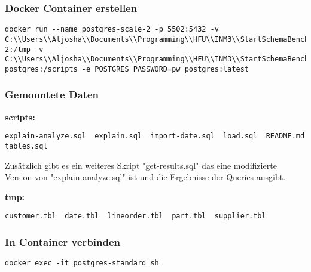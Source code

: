 \label{sec:appendix-ssb-in-postgres}

\subsubsection{Docker Container erstellen}
\begin{lstlisting}[caption=Ohne Config, label=code:ohneconfig]
docker run --name postgres-scale-2 -p 5502:5432 -v C:\\Users\\Aljosha\\Documents\\Programming\\HFU\\INM3\\StartSchemaBenchmark\\generated\\scale-2:/tmp -v C:\\Users\\Aljosha\\Documents\\Programming\\HFU\\INM3\\StartSchemaBenchmark\\Postgres\\ssb-postgres:/scripts -e POSTGRES_PASSWORD=pw postgres:latest
\end{lstlisting}

\subsubsection{Gemountete Daten}
\noindent \textbf{scripts:}
\begin{lstlisting}[caption=Scripts im Verzeichnis, label=code:scriptfiles]
explain-analyze.sql  explain.sql  import-date.sql  load.sql  README.md  tables.sql
\end{lstlisting}
Zusätzlich gibt es ein weiteres Skript "get-results.sql" das eine modifizierte Version von "explain-analyze.sql" ist und die Ergebnisse der Queries ausgibt.

\noindent \textbf{tmp:}
\begin{lstlisting}[caption=Temporäre Dateien, label=code:tmpfiles]
customer.tbl  date.tbl  lineorder.tbl  part.tbl  supplier.tbl
\end{lstlisting}

\subsubsection{In Container verbinden}
\begin{lstlisting}[caption=In Container verbinden, label=code:connectcontainer]
docker exec -it postgres-standard sh
\end{lstlisting}


